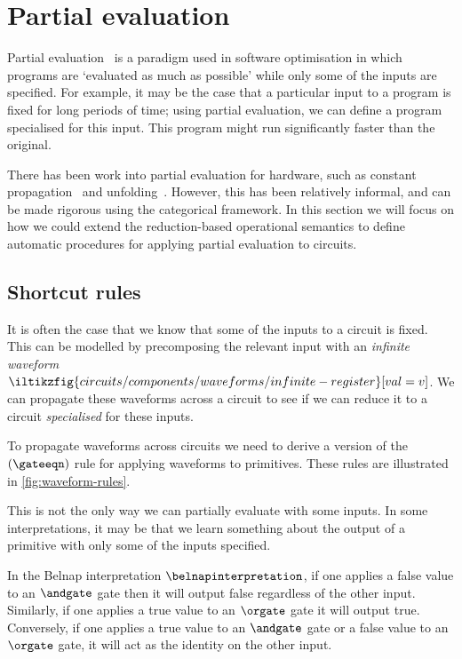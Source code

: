 \section{Partial evaluation}\label{sec:partial}

Partial evaluation~\cite{jones1996introduction} is a paradigm used in software
optimisation in which programs are `evaluated as much as possible' while only
some of the inputs are specified.
For example, it may be the case that a particular input to a program is fixed
for long periods of time; using partial evaluation, we can define a program
specialised for this input.
This program might run significantly faster than the original.

There has been work into partial evaluation for hardware, such as constant
propagation~\cite{singh1996expressing,singh1999partial} and
unfolding~\cite{thompson2006bitlevel}.
However, this has been relatively informal, and can be made rigorous using the
categorical framework.
In this section we will focus on how we could extend the reduction-based
operational semantics to define automatic procedures for applying partial
evaluation to circuits.

\subsection{Shortcut rules}\label{sec:shortcut}

It is often the case that we know that some of the inputs to a circuit is fixed.
This can be modelled by precomposing the relevant input with an
\emph{infinite waveform} \(
\iltikzfig{circuits/components/waveforms/infinite-register}[val=v]
\).
We can propagate these waveforms across a circuit to see if we can reduce it to
a circuit \emph{specialised} for these inputs.

To propagate waveforms across circuits we need to derive a version of the
\((\gateeqn)\) rule for applying waveforms to primitives.
These rules are illustrated in \cref{fig:waveform-rules}.



This is not the only way we can partially evaluate with some inputs.
In some interpretations, it may be that we learn something about the output of
a primitive with only some of the inputs specified.

\begin{example}
    In the Belnap interpretation \(\belnapinterpretation\), if one applies a
    false value to an \(\andgate\) gate then it will output false regardless of
    the other input.
    Similarly, if one applies a true value to an \(\orgate\) gate it will output
    true.
    Conversely, if one applies a true value to an \(\andgate\) gate or a false
    value to an \(\orgate\) gate, it will act as the identity on the other
    input.
\end{example}

